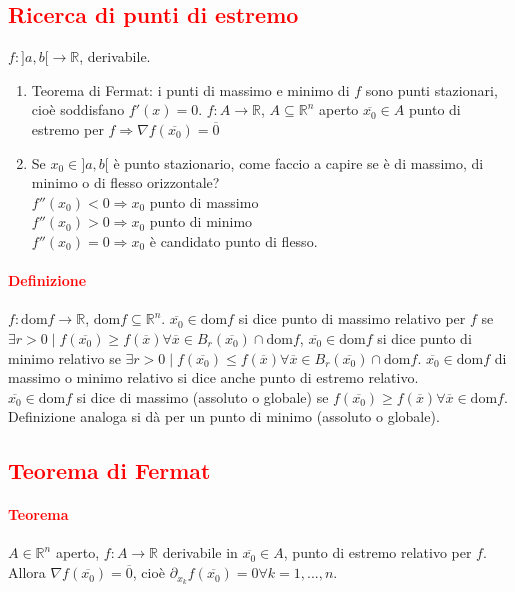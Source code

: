 \documentclass{article}
\newcommand{\R}{\mathbb{R}}
\newcommand{\dom}{\text{dom}}
\begin{document}
\subsection{\textcolor{red}{Ricerca di punti di estremo}}
$f:]a,b[\rightarrow \R$, derivabile.
\begin{enumerate}
    \item Teorema di Fermat: i punti di massimo e minimo di $f$ sono punti stazionari, cioè soddisfano $f'(x)=0$.
    $f: A \rightarrow \R$, $A \subseteq \R^n$ aperto $\overline{x_0}\in A$ punto di estremo per $f \Rightarrow \nabla f(\overline{x_0})=\overline{0}$
    \item Se $x_0 \in ]a,b[$ è punto stazionario, come faccio a capire se è di massimo, di minimo o di flesso orizzontale?\\
    $f''(x_0)<0 \Rightarrow x_0$ punto di massimo\\
    $f''(x_0)>0 \Rightarrow x_0$ punto di minimo\\
    $f''(x_0)=0 \Rightarrow x_0$ è candidato punto di flesso.
\end{enumerate}
\paragraph{\textcolor{red}{Definizione}}
$f:\dom f \rightarrow \R$, $\dom f \subseteq \R^n$. $\overline{x_0}\in \dom f$ si dice punto di massimo relativo per $f$ se $\exists r >0 \mid f(\overline{x_0})\geq f(\overline{x})\forall\overline{x}\in B_r(\overline{x_0})\cap \dom f$, $\overline{x_0}\in \dom f$ si dice punto di minimo relativo se $\exists r >0 \mid f(\overline{x_0})\leq f(\overline{x})\forall \overline{x} \in B_r(\overline{x_0})\cap \dom f$. $\overline{x_0} \in \dom f$ di massimo o minimo relativo si dice anche punto di estremo relativo.\\
$\overline{x_0}\in \dom f$ si dice di massimo (assoluto o globale) se $f(\overline{x_0})\geq f(\overline{x})\forall \overline{x} \in \dom f$. Definizione analoga si dà per un punto di minimo (assoluto o globale).

\subsection{\textcolor{red}{Teorema di Fermat}}
\paragraph{\textcolor{red}{Teorema}}
$A \in \R^n$ aperto, $f: A \rightarrow \R$ derivabile in $\overline{x_0} \in A$, punto di estremo relativo per $f$. Allora $\nabla f(\overline{x_0})=\overline{0}$, cioè $\partial_{x_k}f(\overline{x_0})=0 \forall k =1,...,n$.
\end{document}
